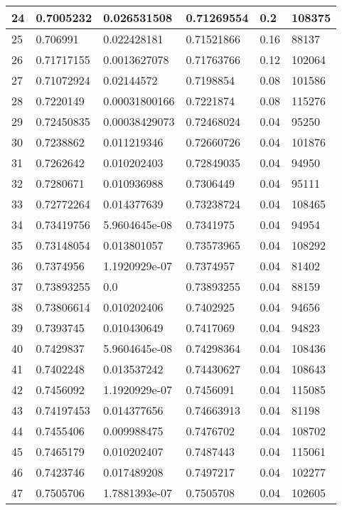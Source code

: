 \begin{longtable}{|l|l|l|l|l|l|}
24 & 0.7005232 & 0.026531508 & 0.71269554 & 0.2 & 108375 \\ \hline 
25 & 0.706991 & 0.022428181 & 0.71521866 & 0.16 & 88137 \\ \hline 
26 & 0.71717155 & 0.0013627078 & 0.71763766 & 0.12 & 102064 \\ \hline 
27 & 0.71072924 & 0.02144572 & 0.7198854 & 0.08 & 101586 \\ \hline 
28 & 0.7220149 & 0.00031800166 & 0.7221874 & 0.08 & 115276 \\ \hline 
29 & 0.72450835 & 0.00038429073 & 0.72468024 & 0.04 & 95250 \\ \hline 
30 & 0.7238862 & 0.011219346 & 0.72660726 & 0.04 & 101876 \\ \hline 
31 & 0.7262642 & 0.010202403 & 0.72849035 & 0.04 & 94950 \\ \hline 
32 & 0.7280671 & 0.010936988 & 0.7306449 & 0.04 & 95111 \\ \hline 
33 & 0.72772264 & 0.014377639 & 0.73238724 & 0.04 & 108465 \\ \hline 
34 & 0.73419756 & 5.9604645e-08 & 0.7341975 & 0.04 & 94954 \\ \hline 
35 & 0.73148054 & 0.013801057 & 0.73573965 & 0.04 & 108292 \\ \hline 
36 & 0.7374956 & 1.1920929e-07 & 0.7374957 & 0.04 & 81402 \\ \hline 
37 & 0.73893255 & 0.0 & 0.73893255 & 0.04 & 88159 \\ \hline 
38 & 0.73806614 & 0.010202406 & 0.7402925 & 0.04 & 94656 \\ \hline 
39 & 0.7393745 & 0.010430649 & 0.7417069 & 0.04 & 94823 \\ \hline 
40 & 0.7429837 & 5.9604645e-08 & 0.74298364 & 0.04 & 108436 \\ \hline 
41 & 0.7402248 & 0.013537242 & 0.74430627 & 0.04 & 108643 \\ \hline 
42 & 0.7456092 & 1.1920929e-07 & 0.7456091 & 0.04 & 115085 \\ \hline 
43 & 0.74197453 & 0.014377656 & 0.74663913 & 0.04 & 81198 \\ \hline 
44 & 0.7455406 & 0.009988475 & 0.7476702 & 0.04 & 108702 \\ \hline 
45 & 0.7465179 & 0.010202407 & 0.7487443 & 0.04 & 115061 \\ \hline 
46 & 0.7423746 & 0.017489208 & 0.7497217 & 0.04 & 102277 \\ \hline 
47 & 0.7505706 & 1.7881393e-07 & 0.7505708 & 0.04 & 102605 \\ \hline 

\end{longtable}
